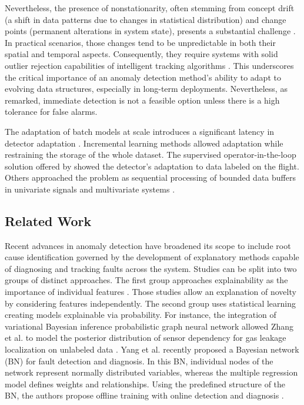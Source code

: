 Nevertheless, the presence of nonstationarity, often stemming from concept drift (a shift in data patterns due to changes in statistical distribution) and change points (permanent alterations in system state), presents a substantial challenge \citep{Salehi2018}. In practical scenarios, those changes tend to be unpredictable in both their spatial and temporal aspects. Consequently, they require systems with solid outlier rejection capabilities of intelligent tracking algorithms \citep{Barbosa2019162}. This underscores the critical importance of an anomaly detection method's ability to adapt to evolving data structures, especially in long-term deployments. Nevertheless, as \citep{Tartakovsky2013} remarked, immediate detection is not a feasible option unless there is a high tolerance for false alarms. 

The adaptation of batch models at scale introduces a significant latency in detector adaptation \citep{Wu2021}. Incremental learning methods allowed adaptation while restraining the storage of the whole dataset. The supervised operator-in-the-loop solution offered by \citet{Pannu2012} showed the detector's adaptation to data labeled on the flight.
Others approached the problem as sequential processing of bounded data buffers in univariate signals \citep{Ahmad2017134} and multivariate systems \citep{Bosman201514}.

\subsection{Related Work}
Recent advances in anomaly detection have broadened its scope to include root cause identification governed by the development of explanatory methods capable of diagnosing and tracking faults across the system. Studies can be split into two groups of distinct approaches. The first group approaches explainability as the importance of individual features \citep{Carletti2019, Nguyen2019, Amarasinghe2018}. Those studies allow an explanation of novelty by considering features independently. The second group uses statistical learning creating models explainable via probability. For instance, the integration of variational Bayesian inference probabilistic graph neural network allowed Zhang et al. to model the posterior distribution of sensor dependency for gas leakage localization on unlabeled data \citep{ZHANG2023120542}. Yang et al. recently proposed a Bayesian network (BN) for fault detection and diagnosis. In this BN, individual nodes of the network represent normally distributed variables, whereas the multiple regression model defines weights and relationships. Using the predefined structure of the BN, the authors propose offline training with online detection and diagnosis \citep{Yang2022}.

